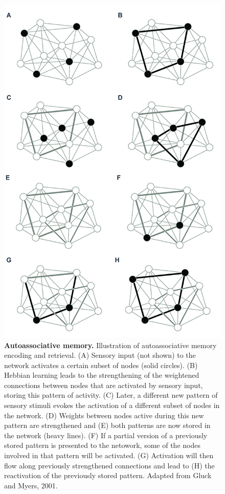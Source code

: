\documentclass[12pt,a4paperpaper,]{report}
\begin{document}
\begin{figure}[htbp]
\centering
\includegraphics{source/figures/autoassociative.jpg}
\caption{\textbf{Autoassociative memory.} Illustration of
autoassociative memory encoding and retrieval. (A) Sensory input (not
shown) to the network activates a certain subset of nodes (solid
circles). (B) Hebbian learning leads to the strengthening of the
weightened connections between nodes that are activated by sensory
input, storing this pattern of activity. (C) Later, a different new
pattern of sensory stimuli evokes the activation of a different subset
of nodes in the network. (D) Weights between nodes active during this
new pattern are strengthened and (E) both patterns are now stored in the
network (heavy lines). (F) If a partial version of a previously stored
pattern is presented to the netowork, some of the nodes involved in that
pattern will be activated. (G) Activation will then flow along
previously strengthened connections and lead to (H) the reactivation of
the previously stored pattern. Adapted from Gluck and Myers, 2001.
\label{ref_a_figure}}
\end{figure}
\end{document}
